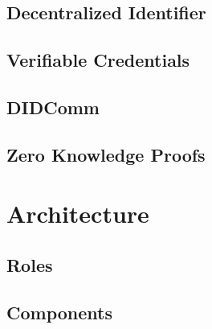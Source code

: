 	    \subsection{Decentralized Identifier}
	    \subsection{Verifiable Credentials}
		\subsection{DIDComm}
		\subsection{Zero Knowledge Proofs}
	\section{Architecture}
	\subsection{Roles}
	\subsection{Components}